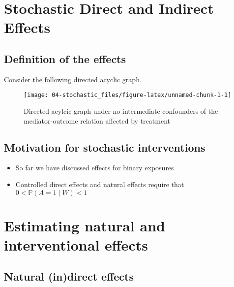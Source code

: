 \documentclass[
  12pt, krantz2,
]{book}
\providecommand{\tightlist}{%
  \setlength{\itemsep}{0pt}\setlength{\parskip}{0pt}}
\theoremstyle{definition}
\theoremstyle{definition}
\theoremstyle{definition}
\renewcommand{\P}{\mathbb{P}}
\newcommand{\1}{\mathbbm{1}}
\begin{document}
\hypertarget{stochastic}{%
\chapter{Stochastic Direct and Indirect Effects}\label{stochastic}}

\hypertarget{definition-of-the-effects-1}{%
\section{Definition of the effects}\label{definition-of-the-effects-1}}

Consider the following directed acyclic graph.

\begin{figure}

{\centering \texttt{[image: 04-stochastic\_files/figure-latex/unnamed-chunk-1-1]} 

}

\caption{Directed acylcic graph under no intermediate confounders of the mediator-outcome relation affected by treatment}\label{fig:unnamed-chunk-1}
\end{figure}

\hypertarget{motivation-for-stochastic-interventions}{%
\section{Motivation for stochastic interventions}\label{motivation-for-stochastic-interventions}}

\begin{itemize}
\tightlist
\item
  So far we have discussed effects for binary exposures
\item
  Controlled direct effects and natural effects require that \(0 < \P(A=1\mid W) < 1\)
\end{itemize}

\hypertarget{estimating-natural-and-interventional-effects}{%
\chapter{Estimating natural and interventional effects}\label{estimating-natural-and-interventional-effects}}

\hypertarget{natural-indirect-effects}{%
\section{Natural (in)direct effects}\label{natural-indirect-effects}}
\end{document}
